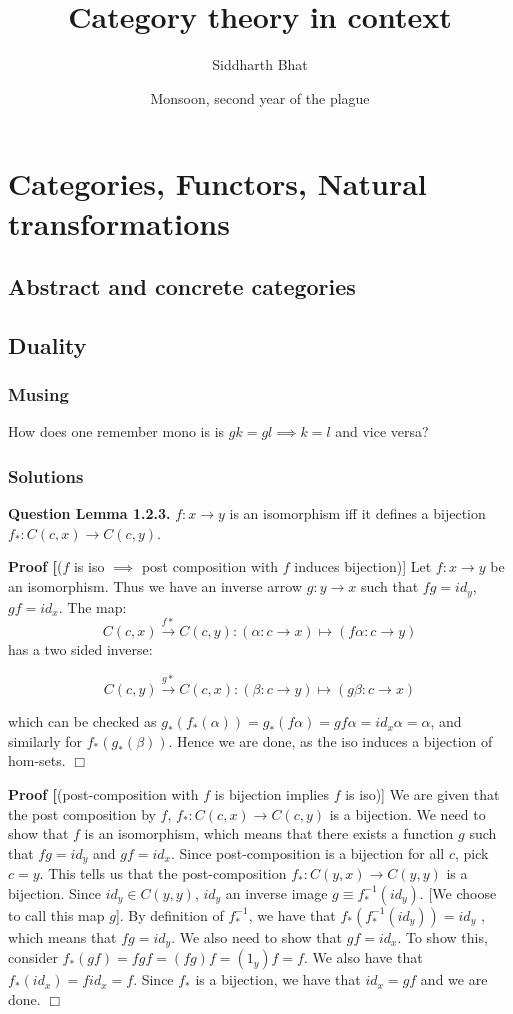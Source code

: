 \documentclass[11pt]{report}
\title{Category theory in context}
\author{Siddharth Bhat}
\date{Monsoon, second year of the plague}
\def\qed{$\Box$}
\newcommand*{\question}[1]{\leavevmode\newline \textbf{Question #1.}}
\newcommand*{\proof}[1]{\leavevmode\newline \textbf{Proof #1}}
\begin{document}
\maketitle
\tableofcontents
\chapter{Categories, Functors, Natural transformations}
\section{Abstract and concrete categories}
\section{Duality}
\subsection{Musing}
How does one remember mono is is $gk = gl \implies k = l$ and vice versa?

\subsection{Solutions}
\question{Lemma 1.2.3} $f: x \to y$ is an isomorphism iff it defines a bijection $f_*: C(c, x) \to C(c, y)$.


\proof[($f$ is iso $\implies$ post composition with $f$ induces bijection)]
Let $f: x \to y$ be an isomorphism. Thus we have an inverse arrow $g: y \to x$ such that $fg = id_y$, $gf = id_x$.
The map: $$C(c, x) \xrightarrow{f*} C(c, y): (\alpha: c \to x) \mapsto (f\alpha: c \to y)$$
has a two sided inverse:

$$
C(c, y) \xrightarrow{g*} C(c, x): (\beta: c \to y) \mapsto (g\beta: c \to x)
$$

which can be checked as $g_*(f_*(\alpha)) = g_*(f\alpha) = gf\alpha = id_x\alpha = \alpha$, and similarly for $f_*(g_*(\beta))$.
Hence we are done, as the iso induces a bijection of hom-sets.
\qed


\proof[(post-composition with $f$ is bijection implies $f$ is iso)]
We are given that the post composition by $f$, $f_*: C(c, x) \rightarrow C(c, y)$ is a bijection.
We need to show that $f$ is an isomorphism, which means that there exists a function $g$ such that $fg = id_y$ and $gf = id_x$.
Since post-composition is a bijection for all $c$, pick $c = y$. This tells us that the post-composition 
$f_*: C(y, x) \rightarrow C(y, y)$ is a bijection. Since $id_y \in C(y, y)$, $id_y$ an inverse image $g \equiv f_*^{-1}(id_y)$. 
[We choose to call this map $g$]. By definition of $f_*^{-1}$, we have that $f_*(f_*^{-1}(id_y)) = id_y$ , which means
that $fg = id_y$. We also need to show that $gf = id_x$. To show this, consider $f_*(gf) = fgf = (fg)f = (1_y)f = f$.
We also have that $f_*(id_x) = f id_x = f$. Since $f_*$ is a bijection, we have that $id_x = gf$ and we are done.  \qed
\end{document}
